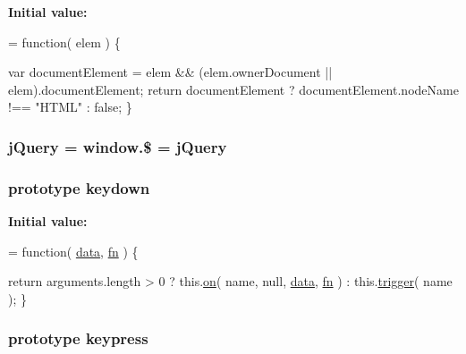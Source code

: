 {\bfseries Initial value\-:}
\begin{DoxyCode}
= \textcolor{keyword}{function}( elem ) \{


    
    
    var documentElement = elem && (elem.ownerDocument || elem).documentElement;
    \textcolor{keywordflow}{return} documentElement ? documentElement.nodeName !== \textcolor{stringliteral}{"HTML"} : \textcolor{keyword}{false};
\}
\end{DoxyCode}
\hypertarget{jquery-1_810_82-vsdoc_8js_add5237586d970a38a81f990e8eb28c6c}{
\subsubsection[{j\-Query}]{ j\-Query = window.\$ = j\-Query}}\label{jquery-1_810_82-vsdoc_8js_add5237586d970a38a81f990e8eb28c6c}
\hypertarget{jquery-1_810_82-vsdoc_8js_af982393c1b8eb2a9ba4c7337f625ad89}{
\subsubsection[{keydown}]{ {\bf prototype} keydown}}\label{jquery-1_810_82-vsdoc_8js_af982393c1b8eb2a9ba4c7337f625ad89}
{\bfseries Initial value\-:}
\begin{DoxyCode}
= \textcolor{keyword}{function}( \hyperlink{jquery-1_810_82-vsdoc_8js_a609407b3456fdc3c5671a9fc4a226ff7}{data}, \hyperlink{jquery-1_810_82-vsdoc_8js_acef6bdaf6b9b20fdcca1ea86f0902c3b}{fn} ) \{


        \textcolor{keywordflow}{return} arguments.length > 0 ?
            this.\hyperlink{jquery-1_810_82-vsdoc_8js_ae453b412b883f60220d73468ef6c6dbc}{on}( name, null, \hyperlink{jquery-1_810_82-vsdoc_8js_a609407b3456fdc3c5671a9fc4a226ff7}{data}, \hyperlink{jquery-1_810_82-vsdoc_8js_acef6bdaf6b9b20fdcca1ea86f0902c3b}{fn} ) :
            this.\hyperlink{jquery-1_810_82-vsdoc_8js_a2388c4114d5e3e4eab020f973641519c}{trigger}( name );
    \}
\end{DoxyCode}
\hypertarget{jquery-1_810_82-vsdoc_8js_a617a8713f64ec1d97c7abe00cbae31e4}{
\subsubsection[{keypress}]{ {\bf prototype} keypress}}\label{jquery-1_810_82-vsdoc_8js_a617a8713f64ec1d97c7abe00cbae31e4}
